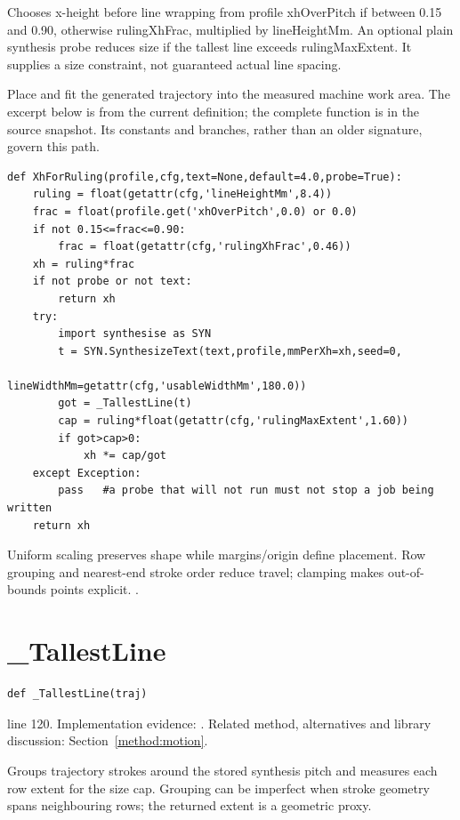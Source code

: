 Chooses x-height before line wrapping from profile xhOverPitch if between 0.15 and 0.90, otherwise rulingXhFrac, multiplied by lineHeightMm. An optional plain synthesis probe reduces size if the tallest line exceeds rulingMaxExtent. It supplies a size constraint, not guaranteed actual line spacing.


Place and fit the generated trajectory into the measured machine work area. The excerpt below is from the current definition; the complete function is in the source snapshot. Its constants and branches, rather than an older signature, govern this path.


\begin{lstlisting}[style=plain]
def XhForRuling(profile,cfg,text=None,default=4.0,probe=True):
    ruling = float(getattr(cfg,'lineHeightMm',8.4))
    frac = float(profile.get('xhOverPitch',0.0) or 0.0)
    if not 0.15<=frac<=0.90:
        frac = float(getattr(cfg,'rulingXhFrac',0.46))
    xh = ruling*frac
    if not probe or not text:
        return xh
    try:
        import synthesise as SYN
        t = SYN.SynthesizeText(text,profile,mmPerXh=xh,seed=0,
                               lineWidthMm=getattr(cfg,'usableWidthMm',180.0))
        got = _TallestLine(t)
        cap = ruling*float(getattr(cfg,'rulingMaxExtent',1.60))
        if got>cap>0:
            xh *= cap/got
    except Exception:
        pass   #a probe that will not run must not stop a job being written
    return xh
\end{lstlisting}
Uniform scaling preserves shape while margins/origin define placement. Row grouping and nearest-end stroke order reduce travel; clamping makes out-of-bounds points explicit. \cite{bresenham1965,code2026}.


\section{\_TallestLine}\label{fn:reproduce:-TallestLine}
\begin{lstlisting}[style=sig]
def _TallestLine(traj)
\end{lstlisting}
 line 120. Implementation evidence: \cite{code2026}. Related method, alternatives and library discussion: Section~\ref{method:motion}.


Groups trajectory strokes around the stored synthesis pitch and measures each row extent for the size cap. Grouping can be imperfect when stroke geometry spans neighbouring rows; the returned extent is a geometric proxy.


